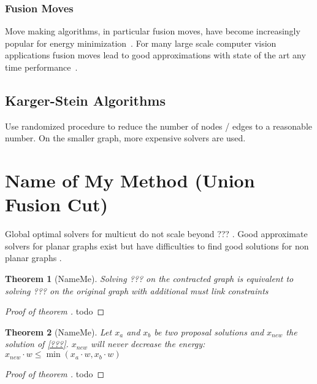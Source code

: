 \documentclass[10pt,twocolumn,letterpaper]{article}
\newtheorem{theorem}{Theorem}
\begin{document}
\subsubsection{Fusion Moves}
Move making algorithms, in particular fusion moves, 
have become increasingly popular for energy minimization~\cite{???,kappes_2014_ws}.
For many large scale computer vision applications fusion moves lead to good approximations
with state of the art any time performance~\cite{kappes_2014_ws}.




\subsection{Karger-Stein Algorithms}
Use randomized procedure to reduce the number of nodes / edges to a reasonable 
number.
On the smaller graph, more expensive solvers are used.



\section{Name of My Method (Union Fusion Cut)}

Global optimal solvers for multicut do not scale beyond ??? \cite{???}.
Good approximate solvers for planar graphs exist \cite{beifiger_2014_cvpr,yarkony_2012_eccv} 
but have difficulties to find good solutions for non planar graphs \cite{beier_2014_cvpr}.


\begin{theorem}[NameMe]
Solving ??? on the contracted graph is 
equivalent to solving ??? on the 
original graph with additional 
must link constraints
\end{theorem}

\begin{proof}[Proof of theorem ]
todo
\end{proof}



\begin{theorem}[NameMe]
Let $x_{a}$ and $x_{b}$ be two proposal solutions and  $x_{new}$ the solution of \ref{???}.
$x_{new}$  will never decrease the energy:
$x_{new} \cdot w \leq  \min( x_{a}\cdot w,  x_{b}\cdot w) $ 
\end{theorem}

\begin{proof}[Proof of theorem ]
todo
\end{proof}
\end{document}
